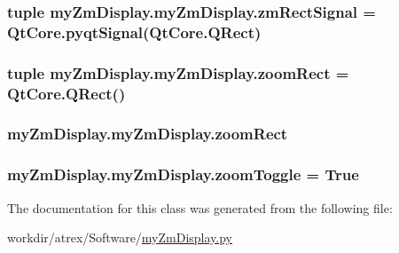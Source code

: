 \hypertarget{classmy_zm_display_1_1my_zm_display_a24271d6d079df901d5128772fea0400b}{
\subsubsection[{zm\-Rect\-Signal}]{\setlength{\rightskip}{0pt plus 5cm}tuple my\-Zm\-Display.\-my\-Zm\-Display.\-zm\-Rect\-Signal = Qt\-Core.\-pyqt\-Signal(Qt\-Core.\-Q\-Rect)\hspace{0.3cm}{\ttfamily [static]}}}\label{classmy_zm_display_1_1my_zm_display_a24271d6d079df901d5128772fea0400b}
\hypertarget{classmy_zm_display_1_1my_zm_display_a1caafb5ed9bfd30d1e992c754389a331}{
\subsubsection[{zoom\-Rect}]{\setlength{\rightskip}{0pt plus 5cm}tuple my\-Zm\-Display.\-my\-Zm\-Display.\-zoom\-Rect = Qt\-Core.\-Q\-Rect()\hspace{0.3cm}{\ttfamily [static]}}}\label{classmy_zm_display_1_1my_zm_display_a1caafb5ed9bfd30d1e992c754389a331}
\hypertarget{classmy_zm_display_1_1my_zm_display_a7aec333c091a737ace35d96d4a4e2991}{
\subsubsection[{zoom\-Rect}]{\setlength{\rightskip}{0pt plus 5cm}my\-Zm\-Display.\-my\-Zm\-Display.\-zoom\-Rect}}\label{classmy_zm_display_1_1my_zm_display_a7aec333c091a737ace35d96d4a4e2991}
\hypertarget{classmy_zm_display_1_1my_zm_display_a946f14d48450a167199b9ac2e14af7a4}{
\subsubsection[{zoom\-Toggle}]{\setlength{\rightskip}{0pt plus 5cm}my\-Zm\-Display.\-my\-Zm\-Display.\-zoom\-Toggle = True\hspace{0.3cm}{\ttfamily [static]}}}\label{classmy_zm_display_1_1my_zm_display_a946f14d48450a167199b9ac2e14af7a4}


The documentation for this class was generated from the following file\-:\begin{DoxyCompactItemize}
\item 
workdir/atrex/\-Software/\hyperlink{my_zm_display_8py}{my\-Zm\-Display.\-py}\end{DoxyCompactItemize}
